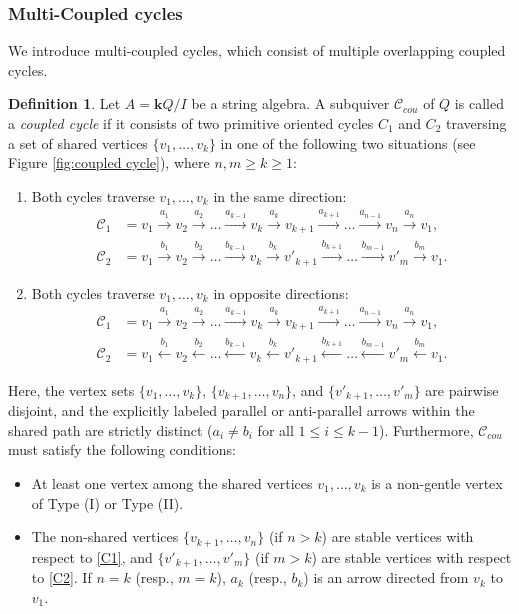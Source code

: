 \documentclass[11pt]{amsart}
\numberwithin{equation}{section}
\theoremstyle{definition}
\newtheorem{definition}[theorem]{Definition}
\begin{document}
\subsubsection{Multi-Coupled cycles}
We introduce multi-coupled cycles, which consist of multiple overlapping coupled cycles. 


\begin{definition}\label{def:couple_cycle}
Let $A = \mathbf{k}Q/I$ be a string algebra. A subquiver $\mathcal{C}_{cou}$ of $Q$ is called a \emph{coupled cycle} if it consists of two primitive oriented cycles $C_1$ and $C_2$ traversing a set of shared vertices $\{v_1, \dots, v_k\}$ in one of the following two situations (see Figure \ref{fig:coupled cycle}), where $n, m \ge k \ge 1$:

\begin{enumerate}[label=(C\arabic*), ref=(C\arabic*)]
    \item \label{C1}  Both cycles traverse $v_1, \dots, v_k$ in the same direction:
    \begin{align*}
        \mathcal{C}_1 &= v_1 \xrightarrow{a_1} v_2 \xrightarrow{a_2} \dots \xrightarrow{a_{k-1}} v_k \xrightarrow{a_k} v_{k+1} \xrightarrow{a_{k+1}} \dots \xrightarrow{a_{n-1}} v_n \xrightarrow{a_n} v_1, \\
       \mathcal{C}_2 &= v_1 \xrightarrow{b_1} v_2 \xrightarrow{b_2} \dots \xrightarrow{b_{k-1}} v_k \xrightarrow{b_k} v'_{k+1} \xrightarrow{b_{k+1}} \dots \xrightarrow{b_{m-1}} v'_m \xrightarrow{b_m} v_1.
    \end{align*}

    \item \label{C2} Both cycles traverse $v_1, \dots, v_k$ in opposite directions:
    \begin{align*}
        \mathcal{C}_1 &= v_1 \xrightarrow{a_1} v_2 \xrightarrow{a_2} \dots \xrightarrow{a_{k-1}} v_k \xrightarrow{a_k} v_{k+1} \xrightarrow{a_{k+1}} \dots \xrightarrow{a_{n-1}} v_n \xrightarrow{a_n} v_1, \\
        \mathcal{C}_2 &= v_1 \xleftarrow{b_1} v_2 \xleftarrow{b_2} \dots \xleftarrow{b_{k-1}} v_k \xleftarrow{b_k} v'_{k+1} \xleftarrow{b_{k+1}} \dots \xleftarrow{b_{m-1}} v'_m \xleftarrow{b_m} v_1.
    \end{align*}
\end{enumerate}
Here, the vertex sets $\{v_1, \dots, v_k\}$, $\{v_{k+1}, \dots, v_n\}$, and $\{v'_{k+1}, \dots, v'_m\}$ are pairwise disjoint, and the explicitly labeled parallel or anti-parallel arrows within the shared path are strictly distinct ($a_i \neq b_i$ for all $1 \le i \le k-1$). Furthermore, $\mathcal{C}_{cou}$ must satisfy the following conditions:
\begin{itemize}
    \item At least one vertex among the shared vertices $v_1, \dots, v_k$ is a non-gentle vertex of Type (I) or Type (II).
    \item The non-shared vertices $\{v_{k+1}, \dots, v_n\}$ (if $n > k$) are stable vertices with respect to \ref{C1}, and $\{v'_{k+1}, \dots, v'_m\}$ (if $m > k$) are stable vertices with respect to \ref{C2}. If $n=k$ (resp., $m=k$), $a_k$ (resp., $b_k$) is an arrow directed from $v_k$ to $v_1$.
\end{itemize}


\end{definition}
\end{document}
